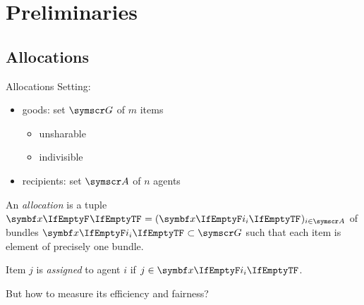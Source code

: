 \section{Preliminaries}

\subsection{Allocations}
\begin{frame}{Allocations}
	Setting:
	\begin{itemize}
		\item
		goods: set \(\goods\) of \(m\) items
		\begin{itemize}
			\item
			unsharable

			\item
			indivisible
		\end{itemize}

		\item
		recipients: set \(\agents\) of \(n\) agents
	\end{itemize}
	\begin{definition}[1]
		An \emph{allocation} is a tuple
		\(\alloc[][] = (\alloc)_{i \in \agents}\)
		of bundles \(\alloc \subset \goods\) such that each item is element of precisely one bundle.

		Item \(j\) is \emph{assigned} to agent \(i\) if \(j \in \alloc\).
	\end{definition}

	But how to measure its efficiency and fairness?
\end{frame}





